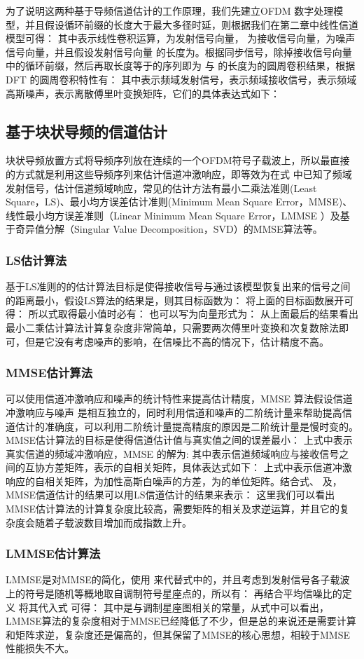 为了说明这两种基于导频信道估计的工作原理，我们先建立OFDM 数字处理模型，并且假设循环前缀的长度大于最大多径时延，则根据我们在第二章中线性信道模型可得：
其中表示线性卷积运算，为发射信号向量， 为接收信号向量，为噪声信号向量，并且假设发射信号向量 的长度为。根据同步信号，除掉接收信号向量中的循环前缀，然后再取长度等于的序列即为 与 的长度为的圆周卷积结果，根据DFT 的圆周卷积特性有：
其中表示频域发射信号，表示频域接收信号，表示频域高斯噪声，表示离散傅里叶变换矩阵，它们的具体表达式如下：
\subsection{基于块状导频的信道估计}
块状导频放置方式将导频序列放在连续的一个OFDM符号子载波上，所以最直接的方式就是利用这些导频序列来估计信道冲激响应，即等效为在式
中已知了频域发射信号，估计信道频域响应，常见的估计方法有最小二乘法准则(Least Square，LS)、最小均方误差估计准则(Minimum Mean Square Error，MMSE)、线性最小均方误差准则（Linear Minimum Mean Square Error，LMMSE ）及基于奇异值分解（Singular Value Decomposition，SVD）的MMSE算法等。
\subsubsection{LS估计算法}
基于LS准则的的估计算法目标是使得接收信号与通过该模型恢复出来的信号之间的距离最小，假设LS算法的结果是，则其目标函数为：
将上面的目标函数展开可得：
所以式取得最小值时必有：
也可以写为向量形式为：
从上面最后的结果看出最小二乘估计算法计算复杂度非常简单，只需要两次傅里叶变换和次复数除法即可，但是它没有考虑噪声的影响，在信噪比不高的情况下，估计精度不高。
\subsubsection{MMSE估计算法}
可以使用信道冲激响应和噪声的统计特性来提高估计精度，MMSE 算法假设信道冲激响应与噪声 是相互独立的，同时利用信道和噪声的二阶统计量来帮助提高信道估计的准确度，可以利用二阶统计量提高精度的原因是二阶统计量是慢时变的。
MMSE估计算法的目标是使得信道估计值与真实值之间的误差最小：
上式中表示真实信道的频域冲激响应，MMSE 的解为\cite{Kay1993FSS}:
其中表示信道频域响应与接收信号之间的互协方差矩阵，表示的自相关矩阵，具体表达式如下：
上式中表示信道冲激响应的自相关矩阵，为加性高斯白噪声的方差，为的单位矩阵。结合式、 及，MMSE信道估计的结果可以用LS信道估计的结果来表示：
这里我们可以看出MMSE估计算法的计算复杂度比较高，需要矩阵的相关及求逆运算，并且它的复杂度会随着子载波数目增加而成指数上升。
\subsubsection{LMMSE估计算法}
LMMSE是对MMSE的简化，使用 来代替式中的\cite{付可2015lte}，并且考虑到发射信号各子载波上的符号是随机等概地取自调制符号星座点的，所以有：
再结合平均信噪比的定义 将其代入式 可得：
其中是与调制星座图相关的常量\cite{张乃元2010lte}，从式中可以看出，LMMSE算法的复杂度相对于MMSE已经降低了不少，但是总的来说还是需要计算和矩阵求逆，复杂度还是偏高的，但其保留了MMSE的核心思想，相较于MMSE性能损失不大。
